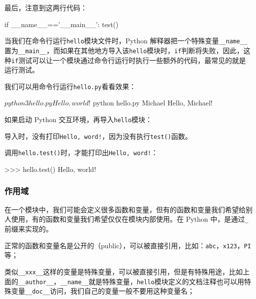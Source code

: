 最后，注意到这两行代码：

\begin{pythoncode}
if __name__=='__main__':
    test()
\end{pythoncode}

当我们在命令行运行\texttt{hello}模块文件时，Python
解释器把一个特殊变量\texttt{\_\_name\_\_}置为\texttt{\_\_main\_\_}，而如果在其他地方导入该\texttt{hello}模块时，\texttt{if}判断将失败，因此，这种\texttt{if}测试可以让一个模块通过命令行运行时执行一些额外的代码，最常见的就是运行测试。

我们可以用命令行运行\texttt{hello.py}看看效果：

\begin{pythoncode}
$ python3 hello.py
Hello, world!
$ python hello.py Michael
Hello, Michael!
\end{pythoncode}

如果启动 Python 交互环境，再导入\texttt{hello}模块：


导入时，没有打印\texttt{Hello,\ word!}，因为没有执行\texttt{test()}函数。

调用\texttt{hello.test()}时，才能打印出\texttt{Hello,\ word!}：

\begin{pythoncode}
>>> hello.test()
Hello, world!
\end{pythoncode}

\hypertarget{ux4f5cux7528ux57df}{%
\subsubsection{作用域}\label{ux4f5cux7528ux57df}}

在一个模块中，我们可能会定义很多函数和变量，但有的函数和变量我们希望给别人使用，有的函数和变量我们希望仅仅在模块内部使用。在
Python 中，是通过\texttt{\_}前缀来实现的。

正常的函数和变量名是公开的（public），可以被直接引用，比如：\texttt{abc}，\texttt{x123}，\texttt{PI}等；

类似\texttt{\_\_xxx\_\_}这样的变量是特殊变量，可以被直接引用，但是有特殊用途，比如上面的\texttt{\_\_author\_\_}，\texttt{\_\_name\_\_}就是特殊变量，\texttt{hello}模块定义的文档注释也可以用特殊变量\texttt{\_\_doc\_\_}访问，我们自己的变量一般不要用这种变量名；

